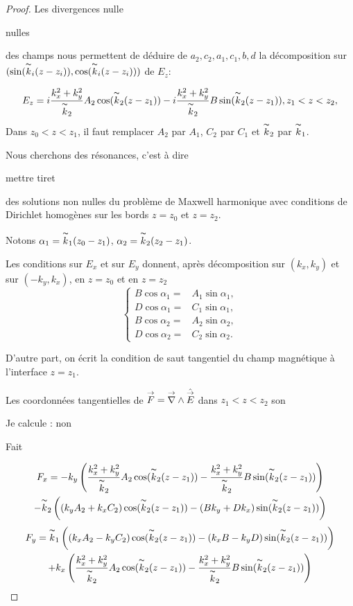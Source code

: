 \begin{proof}
    Les divergences nulle
    \begin{REM}
  nulles
\end{REM} des champs nous permettent de déduire de \(a_2,c_2,a_1,c_1,b,d\) la décomposition sur \((\sin(\overset{\thicksim}{k}_i(z-z_i)),\cos(\overset{\thicksim}{k}_i(z-z_i)))\) de \(E_z\):

    \[
    E_z=i\dfrac{k_x^2+k_y^2}{\overset{\thicksim}{k}_2}A_2\cos(\overset{\thicksim}{k}_2(z-z_1))-i\dfrac{k_x^2+k_y^2}{\overset{\thicksim}{k}_2}B\sin(\overset{\thicksim}{k}_2(z-z_1)), z_1<z<z_2,
    \]
    Dans \(z_0<z<z_1\), il faut remplacer \(A_2\) par \(A_1\), \(C_2\) par \(C_1\) et \(\overset{\thicksim}{k}_2\) par \(\overset{\thicksim}{k}_1\).

    Nous cherchons des résonances, c'est à dire
    \begin{REM}
  mettre tiret
\end{REM} des solutions non nulles du problème de Maxwell harmonique avec conditions de Dirichlet homogènes sur les bords \(z=z_0\) et \(z=z_2\).

    Notons \(\alpha_1=\overset{\thicksim}{k}_1(z_0-z_1)\), \(\alpha_2=\overset{\thicksim}{k}_2(z_2-z_1)\).

    Les conditions sur \(E_x\) et sur \(E_y\) donnent, après décomposition sur \((k_x,k_y)\) et sur \((-k_y,k_x)\), en \(z=z_0\) et en \(z=z_2\)
    \[
    \left\{
    \begin{aligned}
    B\cos \alpha_1={}& A_1\sin \alpha_1,
    \\
    D\cos \alpha_1={}& C_1\sin \alpha_1,
    \\
    B\cos \alpha_2={}& A_2\sin \alpha_2,
    \\
    D\cos \alpha_2={}& C_2\sin \alpha_2.
    \end{aligned}
    \right.
    \]

    D'autre part, on écrit la condition de saut tangentiel du champ magnétique à l'interface \(z=z_1\).

    Les coordonnées tangentielles de \({\overset{\rightarrow}{F}} = {\overset{\rightarrow}{\nabla}}\wedge \hat{{\overset{\rightarrow}{E}}}\) dans \(z_1<z<z_2\) son
    \begin{REM}
  Je calcule : non
\end{REM}
\begin{REP}
Fait
\end{REP}
    \begin{multline*}
    F_x = -k_y\left(\dfrac{k_x^2+k_y^2}{\overset{\thicksim}{k}_2}A_2\cos(\overset{\thicksim}{k}_2(z-z_1))-\dfrac{k_x^2+k_y^2}{\overset{\thicksim}{k}_2}B\sin(\overset{\thicksim}{k}_2(z-z_1))\right)
    \\
    -\overset{\thicksim}{k}_2\left((k_yA_2+k_xC_2)\cos(\overset{\thicksim}{k}_2(z-z_1))-(Bk_y+Dk_x)\sin(\overset{\thicksim}{k}_2(z-z_1))\right)
    \end{multline*}
    \begin{multline*}
    F_y = \overset{\thicksim}{k}_1\left((k_xA_2-k_yC_2)\cos(\overset{\thicksim}{k}_2(z-z_1))-(k_xB-k_yD)\sin(\overset{\thicksim}{k}_2(z-z_1))\right)
    \\
    +k_x\left(\dfrac{k_x^2+k_y^2}{\overset{\thicksim}{k}_2}A_2\cos(\overset{\thicksim}{k}_2(z-z_1))-\dfrac{k_x^2+k_y^2}{\overset{\thicksim}{k}_2}B\sin(\overset{\thicksim}{k}_2(z-z_1))\right)
    \end{multline*}


\end{proof}
